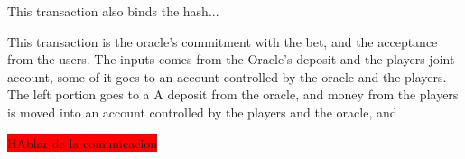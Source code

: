 This transaction also binds the hash...

This transaction is the oracle's commitment with the bet, and the acceptance
  from the users. The inputs comes from the Oracle's deposit and the players
  joint account, some of it goes to an account controlled by the oracle and
  the players. The left portion goes to a
  A deposit from the oracle, and money from the players is
  moved into an account controlled by the players and the oracle, and






\colorbox{red}{HAblar de la comunicacion}

